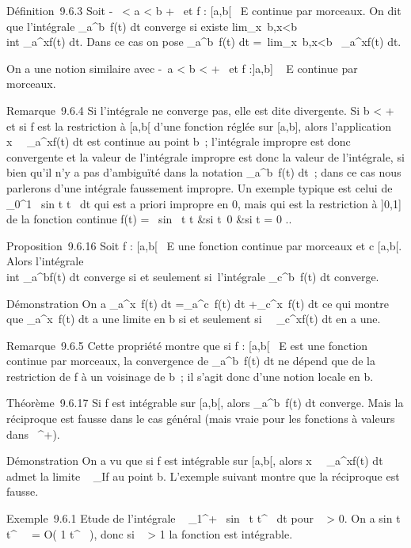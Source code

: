 \documentclass[]{article}
\begin{document}
Définition~9.6.3 Soit -\infty~ < a < b \leq +\infty~ et f :
[a,b[\rightarrow~ E continue par morceaux. On dit que l'intégrale
\int  _a^b~f(t) dt converge si
existe
lim_x\rightarrow~b,x<b~\\int
 _a^xf(t) dt. Dans ce cas on pose
\int  _a^b~f(t) dt
=\
lim_x\rightarrow~b,x<b\int ~
_a^xf(t) dt.

On a une notion similaire avec -\infty~\leq a < b < +\infty~ et f
:]a,b] \rightarrow~ E continue par morceaux.

Remarque~9.6.4 Si l'intégrale ne converge pas, elle est dite divergente.
Si b < +\infty~ et si f est la restriction à [a,b[ d'une
fonction réglée sur [a,b], alors l'application
x\mapsto~\int ~
_a^xf(t) dt est continue au point b~; l'intégrale impropre
est donc convergente et la valeur de l'intégrale impropre est donc la
valeur de l'intégrale, si bien qu'il n'y a pas d'ambiguïté dans la
notation \int  _a^b~f(t) dt~; dans
ce cas nous parlerons d'une intégrale faussement impropre. Un exemple
typique est celui de \int  _0^1~
sin t \over t~ dt qui est a
priori impropre en 0, mais qui est la restriction à ]0,1] de la
fonction continue f(t) = \left \
\cases  sin~ t
\over t &si t\neq~0
 &si t = 0 \cr 
\right ..

Proposition~9.6.16 Soit f : [a,b[\rightarrow~ E une fonction continue par
morceaux et c \in [a,b[. Alors l'intégrale \\int
 _a^bf(t) dt converge si et seulement si~l'intégrale
\int  _c^b~f(t) dt converge.

Démonstration On a \int  _a^x~f(t)
dt =\int  _a^c~f(t) dt
+\int  _c^x~f(t) dt ce qui montre
que \int  _a^x~f(t) dt a une
limite en b si et seulement si~\int ~
_c^xf(t) dt en a une.

Remarque~9.6.5 Cette propriété montre que si f : [a,b[\rightarrow~ E est une
fonction continue par morceaux, la convergence de
\int  _a^b~f(t) dt ne dépend que
de la restriction de f à un voisinage de b~; il s'agit donc d'une notion
locale en b.

Théorème~9.6.17 Si f est intégrable sur [a,b[, alors
\int  _a^b~f(t) dt converge. Mais
la réciproque est fausse dans le cas général (mais vraie pour les
fonctions à valeurs dans ~^+).

Démonstration On a vu que si f est intégrable sur [a,b[, alors
x\mapsto~\int ~
_a^xf(t) dt admet la limite \int ~
_If au point b. L'exemple suivant montre que la réciproque est
fausse.

Exemple~9.6.1 Etude de l'intégrale \int ~
_1^+\infty~ sin~ t
\over t^\alpha~ dt pour \alpha~ > 0. On a
 sin t \over t^\alpha~~
= O( 1 \over t^\alpha~ ), donc si \alpha~
> 1 la fonction est intégrable.
\end{document}

